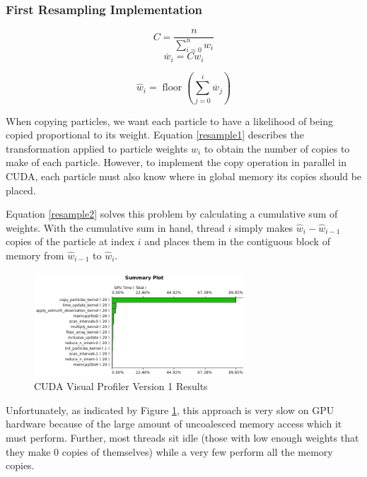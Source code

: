 \documentclass{article}
\begin{document}
\subsubsection{First Resampling Implementation}

\[ C = \frac{n}{\sum_{i=0}^{n} w_{i}} \]
\begin{equation}\label{resample1}
\overline{w}_{i}=C w_{i}
\end{equation}

\begin{equation}\label{resample2}
\hat{w}_{i}=\operatorname{floor}(\sum_{j=0}^{i} \overline{w}_{j})
\end{equation}

When copying particles, we want each particle to have a likelihood of being copied proportional to its weight. Equation \ref{resample1} describes the transformation applied to particle weights \(w_{i}\) to obtain the number of copies to make of each particle. However, to implement the copy operation in parallel in CUDA, each particle must also know where in global memory its copies should be placed.

Equation \ref{resample2} solves this problem by calculating a cumulative sum of weights. With the cumulative sum in hand, thread \(i\) simply makes \(\hat{w}_{i}-\hat{w}_{i-1}\) copies of the particle at index \(i\) and places them in the contiguous block of memory from \(\hat{w}_{i-1}\) to \(\hat{w}_{i}\).

\begin{figure}
\centering
\includegraphics[width=0.7\textwidth]{data/profile_cuda_version1_pic1.png}
\caption{CUDA Visual Profiler Version 1 Results}
\label{profiler1}
\end{figure}

Unfortunately, as indicated by Figure \ref{profiler1}, this approach is very slow on GPU hardware because of the large amount of uncoalesced memory access which it must perform. Further, most threads sit idle (those with low enough weights that they make 0 copies of themselves) while a very few perform all the memory copies.
\end{document}
